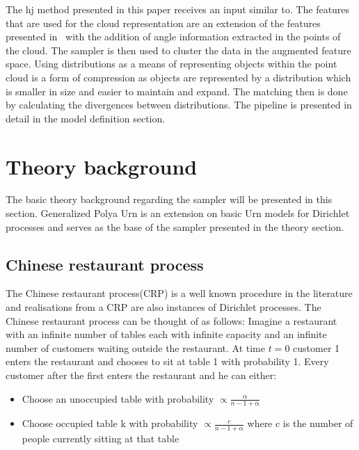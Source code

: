 \documentclass[twoside,hidelinks]{article}
\begin{document}
The hj method presented in this paper receives an input similar to\cite{objectDisc}. The features that are used for the cloud representation are an extension of the features presented in~\cite{smcddp} with the addition of angle information extracted in the points of the cloud. The sampler is then used to cluster the data in the augmented feature space. Using distributions as a means of representing objects within the point cloud is a form of compression as objects are represented by a distribution which is smaller in size and easier to maintain and expand. The matching then is done by calculating the divergences between distributions. The pipeline is presented in detail in the model definition section.
  



\section{Theory background}
\label{sec:theory}

The basic theory background regarding the sampler will be presented in this section. Generalized Polya Urn is an extension on basic Urn\cite{polya} models for Dirichlet processes and serves as the base of the sampler presented in the theory section.


\subsection{Chinese restaurant process}

The Chinese restaurant process(CRP) is a well known procedure in the literature and realisations from a CRP are also instances of Dirichlet processes. The Chinese restaurant process can be thought of as follows: Imagine a restaurant with an infinite number of tables each with infinite capacity and an infinite number of customers waiting outside the restaurant. At time $t=0$ customer 1 enters the restaurant and chooses to sit at table 1 with probability 1. Every customer after the first enters the restaurant and he can either:


\begin{itemize}

	\item Choose an unoccupied table with probability $ \propto \frac{\alpha}{n-1+ \alpha }$

	\item Choose occupied table k with probability $ \propto  \frac{c}{n-1+ \alpha }$ where c is the number of people currently sitting at that table

\end{itemize}
\end{document}
